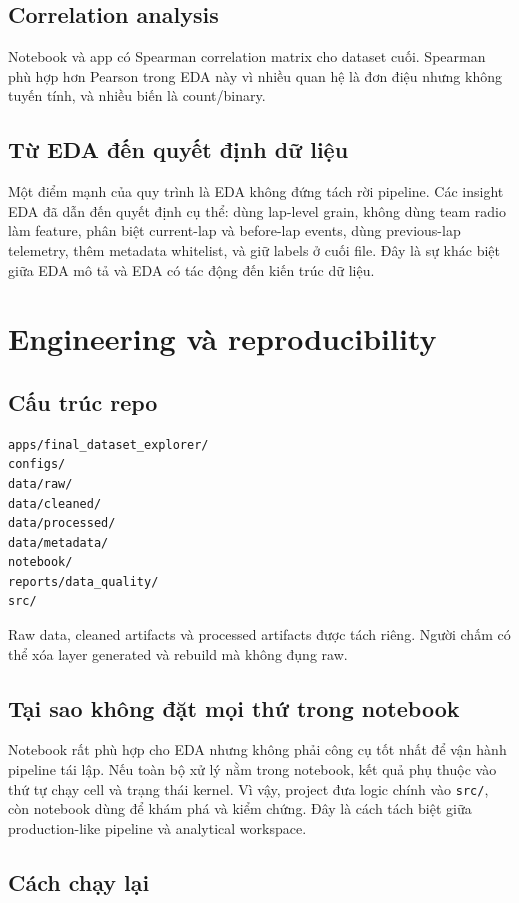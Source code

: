 \documentclass[conference]{IEEEtran}
\begin{document}
\subsection{Correlation analysis}
Notebook và app có Spearman correlation matrix cho dataset cuối. Spearman phù hợp hơn Pearson trong EDA này vì nhiều quan hệ là đơn điệu nhưng không tuyến tính, và nhiều biến là count/binary.

\subsection{Từ EDA đến quyết định dữ liệu}
Một điểm mạnh của quy trình là EDA không đứng tách rời pipeline. Các insight EDA đã dẫn đến quyết định cụ thể: dùng lap-level grain, không dùng team radio làm feature, phân biệt current-lap và before-lap events, dùng previous-lap telemetry, thêm metadata whitelist, và giữ labels ở cuối file. Đây là sự khác biệt giữa EDA mô tả và EDA có tác động đến kiến trúc dữ liệu.

\section{Engineering và reproducibility}
\subsection{Cấu trúc repo}

\begin{lstlisting}
apps/final_dataset_explorer/
configs/
data/raw/
data/cleaned/
data/processed/
data/metadata/
notebook/
reports/data_quality/
src/
\end{lstlisting}

Raw data, cleaned artifacts và processed artifacts được tách riêng. Người chấm có thể xóa layer generated và rebuild mà không đụng raw.

\subsection{Tại sao không đặt mọi thứ trong notebook}
Notebook rất phù hợp cho EDA nhưng không phải công cụ tốt nhất để vận hành pipeline tái lập. Nếu toàn bộ xử lý nằm trong notebook, kết quả phụ thuộc vào thứ tự chạy cell và trạng thái kernel. Vì vậy, project đưa logic chính vào \texttt{src/}, còn notebook dùng để khám phá và kiểm chứng. Đây là cách tách biệt giữa production-like pipeline và analytical workspace.

\subsection{Cách chạy lại}
\end{document}
